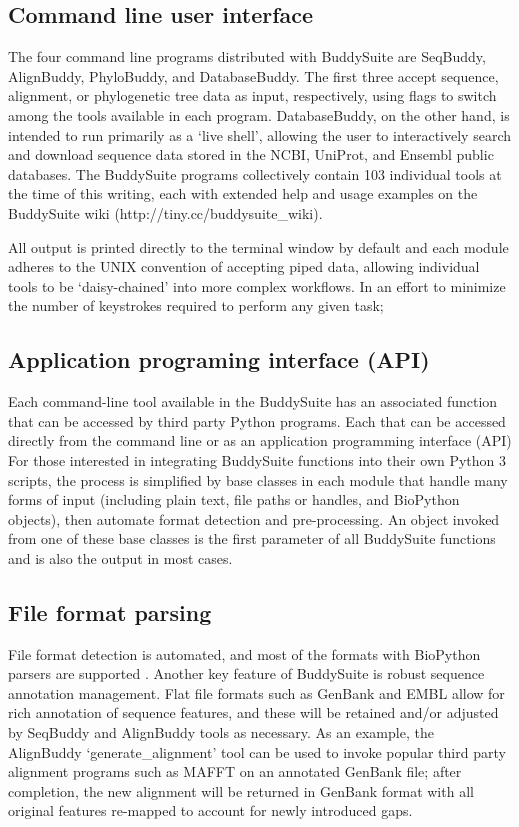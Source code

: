 \documentclass[twocolumn]{bmcart}%
\begin{document}
\subsection*{Command line user interface}
The four command line programs distributed with BuddySuite are SeqBuddy, AlignBuddy, PhyloBuddy, and DatabaseBuddy. The first three accept sequence, alignment, or phylogenetic tree data as input, respectively, using flags to switch among the tools available in each program. DatabaseBuddy, on the other hand, is intended to run primarily as a `live shell', allowing the user to interactively search and download sequence data stored in the NCBI, UniProt, and Ensembl public databases. The BuddySuite programs collectively contain 103 individual tools at the time of this writing, each with extended help and usage examples on the BuddySuite wiki (http://tiny.cc/buddysuite\_wiki).

All output is printed directly to the terminal window by default and each module adheres to the UNIX convention of accepting piped data, allowing individual tools to be `daisy-chained' into more complex workflows. In an effort to minimize the number of keystrokes required to perform any given task;

\subsection*{Application programing interface (API)}
Each command-line tool available in the BuddySuite has an associated function that can be accessed by third party Python programs. Each
that can be accessed directly from the command line or as an application programming interface (API)
For those interested in integrating BuddySuite functions into their own Python 3 scripts, the process is simplified by base classes in each module that handle many forms of input (including plain text, file paths or handles, and BioPython objects), then automate format detection and pre-processing. An object invoked from one of these base classes is the first parameter of all BuddySuite functions and is also the output in most cases.

\subsection*{File format parsing}
File format detection is automated, and most of the formats with BioPython parsers are supported \cite{Cock:2009hj}.
Another key feature of BuddySuite is robust sequence annotation management. Flat file formats such as GenBank and EMBL allow for rich annotation of sequence features, and these will be retained and/or adjusted by SeqBuddy and AlignBuddy tools as necessary. As an example, the AlignBuddy `generate\_alignment' tool can be used to invoke popular third party alignment programs such as MAFFT \cite{Katoh:2013hm} on an annotated GenBank file; after completion, the new alignment will be returned in GenBank format with all original features re-mapped to account for newly introduced gaps.
\end{document}
